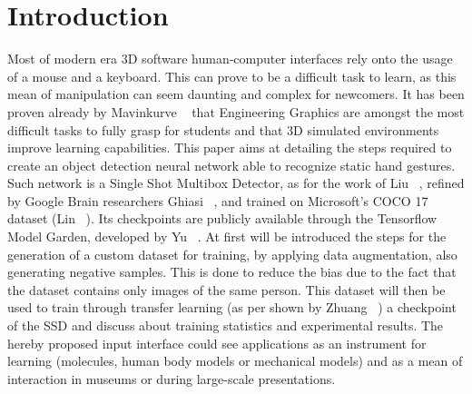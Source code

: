 \documentclass[10pt,twocolumn,letterpaper]{article}
\begin{document}
\section{Introduction}
\begin{flushleft}
Most of modern era 3D software human-computer interfaces rely onto the usage of a mouse and a keyboard. This can prove to be a difficult task to learn, as this mean of manipulation can seem daunting and complex for newcomers.\linebreak
It has been proven already by Mavinkurve \etal~\cite{7814839} that Engineering Graphics are amongst the most difficult tasks to fully grasp for students and that 3D simulated environments improve learning capabilities.\linebreak
This paper aims at detailing the steps required to create an object detection neural network able to recognize static hand gestures. Such network is a Single Shot Multibox Detector, as for the work of Liu \etal~\cite{ssd}, refined by Google Brain researchers Ghiasi \etal~\cite{ghiasi2019nasfpn}, and trained on Microsoft's COCO 17 dataset (Lin \etal~\cite{lin2015microsoft}). Its checkpoints are publicly available through the Tensorflow Model Garden, developed by Yu \etal~\cite{tensorflowmodelgarden2020}.\linebreak
At first will be introduced the steps for the generation of a custom dataset for training, by applying data augmentation, also generating negative samples. This is done to reduce the bias due to the fact that the dataset contains only images of the same person. This dataset will then be used to train through transfer learning (as per shown by Zhuang \etal~\cite{zhuang2020comprehensive}) a checkpoint of the SSD and discuss about training statistics and experimental results.\linebreak
The hereby proposed input interface could see applications as an instrument for learning (molecules, human body models or mechanical models) and as a mean of interaction in museums or during large-scale presentations.
\end{flushleft}
\end{document}
